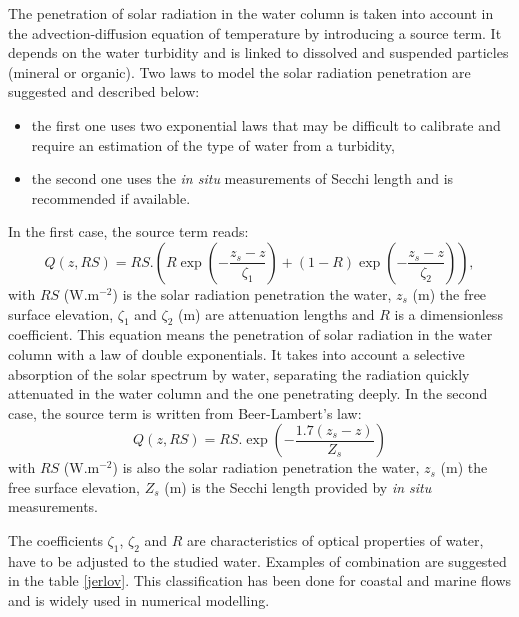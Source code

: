 The penetration of solar radiation in the water column is taken into account
in the advection-diffusion equation of temperature by introducing a source
term. It depends on the water turbidity and is linked to dissolved and
suspended particles (mineral or organic). Two laws to model the solar
radiation penetration are suggested and described below:
\begin{itemize}
\item the first one uses two exponential laws that may be difficult to
calibrate and require an estimation of the type of water from a turbidity,
\item the second one uses the \emph{in situ} measurements of Secchi length and
is recommended if available.
\end{itemize}
In the first case, the source term reads:
\begin{equation}
Q(z,RS) = RS.\left(  R \exp\left(  -\dfrac{z_{s}-z}{\zeta_{1}} \right)  + (1-R)
\exp\left(  -\dfrac{z_{s}-z}{\zeta_{2}} \right)  \right)  ,
\end{equation}
with $RS$ ($\mathrm{{W}.m^{-2}}$) is the solar radiation penetration the
water, $z_{s}$ (m) the free surface elevation, $\zeta_{1}$ and $\zeta_{2}$ (m)
are attenuation lengths and $R$ is a dimensionless coefficient.
This equation means the penetration of solar radiation in the water column
with a law of double exponentials. It takes into account a selective
absorption of the solar spectrum by water, separating the radiation quickly
attenuated in the water column and the one penetrating deeply.
In the second case, the source term is written from Beer-Lambert's law:
\begin{equation}
Q(z,RS) = RS. \exp\left(  -\dfrac{1.7(z_{s}-z)}{Z_{s}} \right)
\end{equation}
with $RS$ ($\mathrm{{W}.m^{-2}}$) is also the solar radiation penetration the
water, $z_{s}$ (m) the free surface elevation, $Z_{s}$ (m) is the Secchi
length provided by \emph{in situ} measurements.

The coefficients $\zeta_{1}$, $\zeta_{2}$ and $R$ are characteristics of
optical properties of water, have to be adjusted to the studied water.
Examples of combination are suggested in the table \ref{jerlov}. This
classification has been done for coastal and marine flows and is widely used
in numerical modelling.

